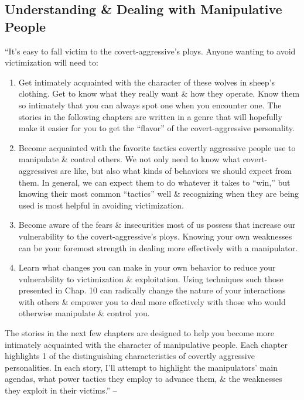 \documentclass{article}
\numberwithin{equation}{section}
\begin{document}
\subsection{Understanding \& Dealing with Manipulative People}
``It's easy to fall victim to the covert-aggressive's ploys. Anyone wanting to avoid victimization will need to:
\begin{enumerate}
	\item Get intimately acquainted with the character of these wolves in sheep's clothing. Get to know what they really want \& how they operate. Know them so intimately that you can always spot one when you encounter one. The stories in the following chapters are written in a genre that will hopefully make it easier for you to get the ``flavor'' of the covert-aggressive personality.
	\item Become acquainted with the favorite tactics covertly aggressive people use to manipulate \& control others. We not only need to know what covert-aggressives are like, but also what kinds of behaviors we should expect from them. In general, we can expect them to do whatever it takes to ``win,'' but knowing their most common ``tactics'' well \& recognizing when they are being used is most helpful in avoiding victimization.
	\item Become aware of the fears \& insecurities most of us possess that increase our vulnerability to the covert-aggressive's ploys. Knowing your own weaknesses can be your foremost strength in dealing more effectively with a manipulator.
	\item Learn what changes you can make in your own behavior to reduce your vulnerability to victimization \& exploitation. Using techniques such those presented in Chap. 10 can radically change the nature of your interactions with others \& empower you to deal more effectively with those who would otherwise manipulate \& control you.
\end{enumerate}
The stories in the next few chapters are designed to help you become more intimately acquainted with the character of manipulative people. Each chapter highlights 1 of the distinguishing characteristics of covertly aggressive personalities. In each story, I'll attempt to highlight the manipulators' main agendas, what power tactics they employ to advance them, \& the weaknesses they exploit in their victims.'' -- \cite[pp. 46--47]{Simon2010}

\end{document}
